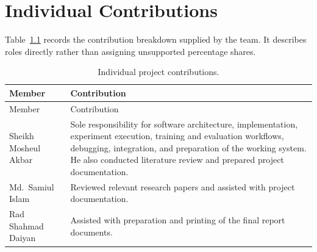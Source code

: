\chapter{Individual Contributions}\label{app:contributions}

Table~\ref{tab:contributions} records the contribution breakdown supplied by the
team. It describes roles directly rather than assigning unsupported percentage
shares.

\begin{longtable}{p{}p{}}
\caption{Individual project contributions.}\label{tab:contributions}\\
\toprule
Member & Contribution\\\midrule\endfirsthead
\toprule
Member & Contribution\\\midrule\endhead
Sheikh Mosheul Akbar & Sole responsibility for software architecture,
implementation, experiment execution, training and evaluation workflows,
debugging, integration, and preparation of the working system. He also conducted
literature review and prepared project documentation.\\
Md.\ Samiul Islam & Reviewed relevant research papers and assisted with project
documentation.\\
Rad Shahmad Daiyan & Assisted with preparation and printing of the final report
documents.\\
\bottomrule
\end{longtable}
